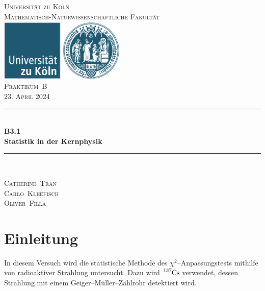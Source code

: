 \documentclass[12pt,a4paper]{scrartcl}
\numberwithin{equation}{section} %
\newcommand{\HRule}{\rule{\linewidth}{0.7mm}}
\begin{document}
\begin{titlepage}
	\pagestyle{empty}

	\begin{center}

	\textsc{\LARGE Universität zu Köln }\\ [0.4cm]
	\textsc{Mathematisch-Naturwissenschaftliche Fakultät} \\[1.5cm]

	\includegraphics[width=0.45\textwidth]{../media/uni.jpg}\\[1.5cm]  %

	\textsc{\Large Praktikum~B}\\[2mm]
	\textsc{23. April 2024}\\[10mm]
	\HRule \\[0.4cm]

		{	\Huge \bfseries B3.1}\\[0.4cm]
			{	\huge \bfseries Statistik in der Kernphysik}\\[0.3cm]
	
	\HRule \\[3cm]

 	\begin{center}
		\textsc{\Large Catherine~Tran } \\[3pt]
		\textsc{\Large Carlo~Kleefisch } \\[3pt]
		\textsc{\Large Oliver~Filla } \\[3pt]
	\end{center}
	\end{center}
\end{titlepage}

\newpage
\tableofcontents
\newpage

\hypertarget{einleitung}{%
\section{Einleitung}\label{einleitung}}

In diesem Versuch wird die statistische Methode des \(\chi^2\)--Anpassungstests mithilfe von radioaktiver Strahlung untersucht. Dazu wird \(\ce{^{137}Cs}\) verwendet, dessen Strahlung mit einem Geiger--Müller--Zählrohr detektiert wird.
\end{document}
